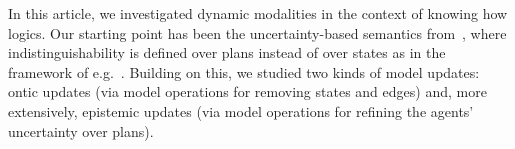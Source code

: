 \begin{comment}
In this paper we investigated dynamic modalities in the context of \emph{knowing how} logics. Our starting point has been the uncertainty-based semantics from~\cite{AFSVQ21,AFSVQ23report}. 
Building on this, we studied two forms of updates: ontic updates, via annoucement-like and arrow-update-like modalities; and epistemic updates, refining the perception of an agent regarding her own abilities. For the operators encompassed in the former family, we showed that in their general form, they increase the expressivity of the logic. Moreover, we restricted ourselves to a particular class of models and we provided axiomatizations via reduction axioms. For the latter family, we discussed some preliminary thoughts and semantic properties of each operator, and we discussed some limitations of this setting. Concretely, we showed that the presented logics lack uniform substitution, a typical property that is used to obtain complete axiomatizations. To deal with this issue, we presented an extended, underlying static language, and then proposed some dynamic modalities for epistemic updates. This contribution is completely novel with respect to~\cite{AFSV22}. Here, we presented a modality that makes a single plan  distinguishable from any other from the perspective of the agents. 
In this extended setting, apart from showing how it could be useful for the examples we introduced, we obtained sound and complete axiomatizations via reduction axioms, and showed that the satisfiability problem for these logics is decidable. 
\end{comment}

In this article, we investigated dynamic modalities in the context of knowing how logics. Our starting point has been the uncertainty-based semantics from~\cite{AFSVQ21,AFSVQ23report}, where indistinguishability is defined over plans instead of over states as in the framework of e.g.~\cite{FervariHLW17,LiW24}. Building on this, we studied two kinds of model updates: ontic updates (via model operations for removing states and edges) and, more extensively, epistemic updates (via model operations for refining the agents' uncertainty over plans). 

